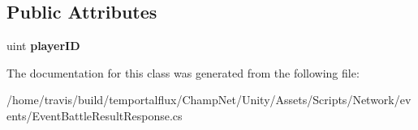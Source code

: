 \subsection*{Public Attributes}
\begin{DoxyCompactItemize}
\item 
\hypertarget{class_event_battle_result_response_ada6f86b445a765ab55896a2f97a688bb}{uint {\bfseries player\-I\-D}}\label{class_event_battle_result_response_ada6f86b445a765ab55896a2f97a688bb}

\end{DoxyCompactItemize}


The documentation for this class was generated from the following file\-:\begin{DoxyCompactItemize}
\item 
/home/travis/build/temportalflux/\-Champ\-Net/\-Unity/\-Assets/\-Scripts/\-Network/events/Event\-Battle\-Result\-Response.\-cs\end{DoxyCompactItemize}
